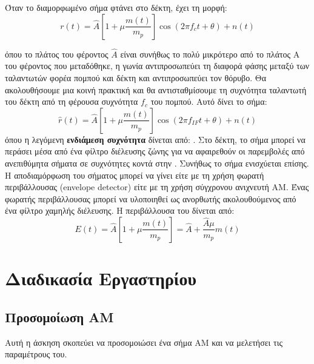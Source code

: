 \documentclass[12pt]{report}
\begin{document}
        Όταν το διαμορφωμένο σήμα φτάνει στο δέκτη, έχει τη μορφή:
        \begin{equation}
            \label{eq:AMrec}
            r(t) = \hat{A}\left[1+\mu \frac{m(t)}{m_p}\right]\cos(2\pi f_ct + \theta) + n(t)
        \end{equation}

        όπου το πλάτος του φέροντος $\hat{A}$ είναι συνήθως το πολύ μικρότερο από το πλάτος A του φέροντος
        που μεταδόθηκε, η γωνία \bm{\theta} αντιπροσωπεύει τη διαφορά φάσης μεταξύ των ταλαντωτών φορέα πομπού
        και δέκτη και  αντιπροσωπεύει τον θόρυβο. Θα ακολουθήσουμε μια κοινή πρακτική και θα
        αντισταθμίσουμε τη συχνότητα ταλαντωτή του δέκτη από τη φέρουσα συχνότητα $f_c$ του πομπού.
        Αυτό δίνει το σήμα:
        \begin{equation}
            \label{eq:AMfreqcomp}
            \hat{r}(t) = \hat{A}\left[1 + \mu \frac{m(t)}{m_p}\right]\cos(2\pi f_{IF}t + \theta) + n(t)
        \end{equation}
        όπου η λεγόμενη \textbf{ενδιάμεση συχνότητα} δίνεται από: .
        Στο δέκτη, το σήμα  μπορεί να περάσει μέσα από ένα φίλτρο διέλευσης ζώνης για να
        αφαιρεθούν οι παρεμβολές από ανεπιθύμητα σήματα σε συχνότητες κοντά στην . 
        Συνήθως το σήμα  ενισχύεται επίσης. Η αποδιαμόρφωση του σήματος 
        μπορεί να γίνει είτε με τη χρήση φωρατή περιβάλλουσας (envelope detector) είτε με τη χρήση 
        σύγχρονου ανιχνευτή AM. Ένας φωρατής περιβάλλουσας μπορεί να υλοποιηθεί ως ανορθωτής 
        ακολουθούμενος από ένα φίλτρο χαμηλής διέλευσης. Η περιβάλλουσα  του 
        δίνεται από:
        \begin{equation}
            \label{eq:envelope}
            E(t) = \hat{A}\left[1 + \mu \frac{m(t)}{m_p}\right] = \hat{A} + \frac{\hat{A} \mu}{m_p}m(t)
        \end{equation}

    \section{\textbf{\textsf{Διαδικασία Εργαστηρίου}}}
        \subsection{\textsf{Προσομοίωση ΑΜ}}
            Αυτή η άσκηση σκοπεύει να προσομοιώσει ένα σήμα AM και να μελετήσει τις παραμέτρους του.
\end{document}
